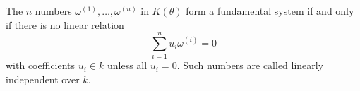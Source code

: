 The $n$ numbers $\omega^{(1)}, \ldots, \omega^{(n)}$ in $K(\theta)$ form a fundamental system if and only if there is no linear relation
$$\sum_{i=1}^{n} u_i \omega^{(i)} = 0$$
with coefficients $u_i \in k$ unless all $u_i = 0$. Such numbers are called linearly independent over $k$.
